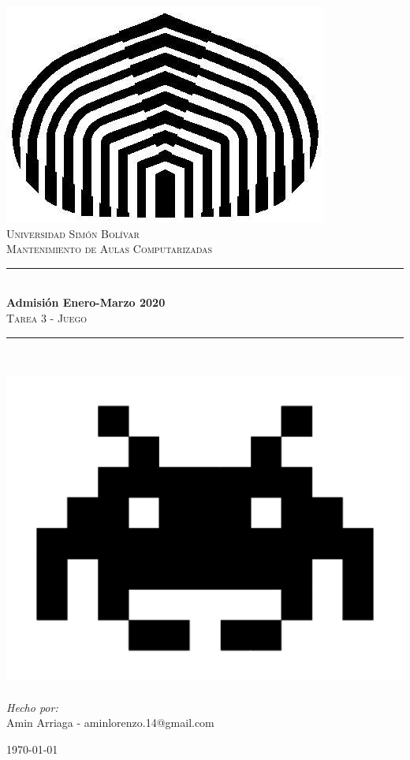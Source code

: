\documentclass[a4paper,10pt]{article}
\date{}
\newcommand{\HRule}{\rule{\linewidth}{0.5mm}}
\begin{document}
\begin{titlepage}
\begin{center}
\includegraphics[scale=0.25]{USB.jpeg}~\\[1cm]

\textsc{\LARGE Universidad Simón Bolívar}\\[1.5cm]
\textsc{\Large Mantenimiento de Aulas Computarizadas}\\[0.5cm]

\HRule \\[0.4cm]
{ \huge \bfseries Admisión Enero-Marzo 2020\\[0.4cm] }
\textsc{Tarea 3 - Juego}\\[0.1cm]

\HRule \\[0.75cm]
\begin{center} \large 
\includegraphics[scale=0.25]{spaceinvader.jpg}~\\[1cm]
\emph{Hecho por:}\\
Amin Arriaga - aminlorenzo.14@gmail.com\\ 
\end{center}
\begin{minipage}{0.4\textwidth}
\begin{flushright} \large
\end{flushright}
\end{minipage}

\vfill
{\large \today}
\end{center}
\end{titlepage}
\end{document}
